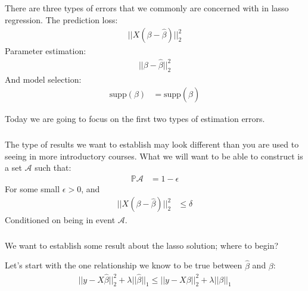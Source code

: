 \begin{frame}[fragile] \frametitle{}

There are three types of errors that we commonly are concerned
with in lasso regression. \pause The prediction loss:
\begin{align*}
|| X (\beta - \widehat{\beta}) ||_2^2
\end{align*}
\pause Parameter estimation:
\begin{align*}
|| \beta - \widehat{\beta} ||_2^2
\end{align*}
\pause And model selection:
\begin{align*}
\text{supp} (\beta) &= \text{supp} (\widehat{\beta})
\end{align*}

\pause Today we are going to focus on the first two types
of estimation errors.

\end{frame}

\begin{frame}[fragile] \frametitle{}

The type of results we want to establish may look different than
you are used to seeing in more introductory courses.
\pause What we will want to be able to construct is a set
$\mathcal{A}$ such that:
\begin{align*}
\mathbb{P} \mathcal{A} &= 1 - \epsilon
\end{align*}
For some small $\epsilon > 0$, and
\begin{align*}
|| X (\beta - \widehat{\beta}) ||_2^2 &\leq \delta
\end{align*}
Conditioned on being in event $\mathcal{A}$.

\end{frame}

\begin{frame}[fragile] \frametitle{}

We want to establish some result about the lasso solution; where
to begin?

Let's start with the one relationship we know to be true between
$\widehat{\beta}$ and $\beta$:
\begin{align*}
|| y - X\widehat{\beta} ||_2^2 + \lambda ||\widehat{\beta}||_1 \leq || y - X\beta ||_2^2 + \lambda ||\beta||_1
\end{align*}

\end{frame}

